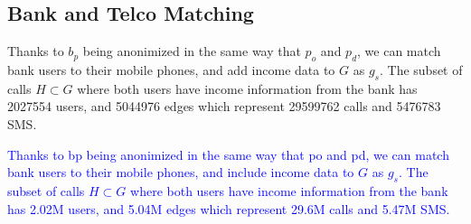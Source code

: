 \subsection{Bank and Telco Matching}

Thanks to \( b_p \) being anonimized in the same way that \( p_o \) and \( p_d \), we can match bank users to their mobile phones, and add income data to \( G \) as \( g_s \). The subset of calls \( H \subset G \) where both users have income information from the bank has \num{2027554} users, and \num{5044976} edges which represent \num{29599762} calls and \num{5476783} SMS.

\textcolor{blue}{Thanks to bp being anonimized in the same way that po and pd, we can match bank users to their mobile phones, and include income data to \( G \) as \( g_s \). The subset of calls \( H \subset G \) where both users have income information from the bank has 2.02M users, and 5.04M edges which represent 29.6M calls and 5.47M SMS.}